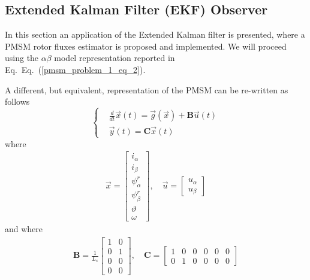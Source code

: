 \documentclass[11pt,a4paper]{scrartcl}
\numberwithin{equation}{section}
\theoremstyle{it}
\theoremstyle{definition}
\renewcommand{\eqref}[1]{Eq.~(\ref{#1})}
\begin{document}
\begin{onehalfspace}
\subsection{Extended Kalman Filter (EKF) Observer}\label{PMSM_EKF}
In this section an application of the Extended Kalman filter is presented, where a PMSM rotor fluxes estimator is proposed and implemented. We will proceed using the  $\alpha\beta$ model representation reported in Eq.~\eqref{pmsm_problem_1_eq_2}. 

A different, but equivalent, representation of the PMSM can be re-written as follows
\begin{equation}\label{pmsm_problem_1_eq_5}
	\left\lbrace \begin{aligned}
		&\frac{d}{dt}\vec{x}(t)=\vec{g}(\vec{x})+\mathbf{B}\vec{u}(t)
		\\[6pt]
		&\vec{y}(t) = \mathbf{C}\vec{x}(t)
	\end{aligned}\right. 
\end{equation} 
where 
\begin{equation}\label{pmsm_problem_1_eq_6}
	\begin{aligned}
		\vec{x}=\begin{bmatrix} i_\alpha \\[6pt] i_\beta \\[6pt] \psi_\alpha^r 
			\\[6pt] \psi_\beta^r \\[6pt] \vartheta \\[6pt] \omega \end{bmatrix},\quad
		\vec{u}=\begin{bmatrix} u_\alpha \\[6pt] u_\beta \end{bmatrix}
	\end{aligned}
\end{equation}
and where
\begin{equation}\label{pmsm_problem_1_eq_7}
	\begin{aligned}
		\mathbf{B} = \frac{1}{L_s}\begin{bmatrix} 1&0 \\[6pt] 
			0&1\\[6pt] 0&0 \\[6pt] 0&0  \end{bmatrix},\quad
		\mathbf{C} = \begin{bmatrix} 1&0&0&0&0&0 \\[6pt] 0&1&0&0&0&0 
		\end{bmatrix}
	\end{aligned}

\end{equation}
\end{onehalfspace}
\end{document}

